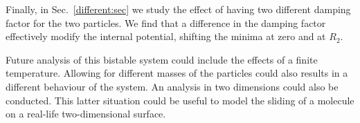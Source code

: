Finally, in Sec.~\ref{different:sec} we study the effect of having two different damping factor for the two particles. We find that a difference in the damping factor effectively modify the internal potential, shifting the minima at zero and at $R_2$.

Future analysis of this bistable system could include the effects of a finite temperature. Allowing for different masses of the particles could also results in a different behaviour of the system. An analysis in two dimensions could also be conducted. This latter situation could be useful to model the sliding of a molecule on a real-life two-dimensional surface. 
